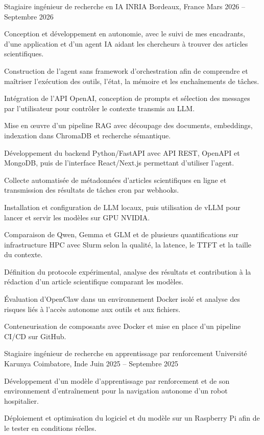 
\begin{cventries}
  \cventry
    {Stagiaire ingénieur de recherche en IA}
    {INRIA}
    {Bordeaux, France}
    {Mars 2026 -- Septembre 2026}
    {
      \begin{cvitems}
        \item {Conception et développement en autonomie, avec le suivi de mes encadrants, d’une application et d’un agent IA aidant les chercheurs à trouver des articles scientifiques.}
        \item {Construction de l’agent sans framework d’orchestration afin de comprendre et maîtriser l’exécution des outils, l’état, la mémoire et les enchaînements de tâches.}
        \item {Intégration de l’API OpenAI, conception de prompts et sélection des messages par l’utilisateur pour contrôler le contexte transmis au LLM.}
        \item {Mise en œuvre d’un pipeline RAG avec découpage des documents, embeddings, indexation dans ChromaDB et recherche sémantique.}
        \item {Développement du backend Python/FastAPI avec API REST, OpenAPI et MongoDB, puis de l’interface React/Next.js permettant d’utiliser l’agent.}
        \item {Collecte automatisée de métadonnées d’articles scientifiques en ligne et transmission des résultats de tâches cron par webhooks.}
        \item {Installation et configuration de LLM locaux, puis utilisation de vLLM pour lancer et servir les modèles sur GPU NVIDIA.}
        \item {Comparaison de Qwen, Gemma et GLM et de plusieurs quantifications sur infrastructure HPC avec Slurm selon la qualité, la latence, le TTFT et la taille du contexte.}
        \item {Définition du protocole expérimental, analyse des résultats et contribution à la rédaction d’un article scientifique comparant les modèles.}
        \item {Évaluation d’OpenClaw dans un environnement Docker isolé et analyse des risques liés à l’accès autonome aux outils et aux fichiers.}
        \item {Conteneurisation de composants avec Docker et mise en place d’un pipeline CI/CD sur GitHub.}
      \end{cvitems}
    }

  \cventry
    {Stagiaire ingénieur de recherche en apprentissage par renforcement}
    {Université Karunya}
    {Coimbatore, Inde}
    {Juin 2025 -- Septembre 2025}
    {
      \begin{cvitems}
        \item {Développement d’un modèle d’apprentissage par renforcement et de son environnement d’entraînement pour la navigation autonome d’un robot hospitalier.}
        \item {Déploiement et optimisation du logiciel et du modèle sur un Raspberry Pi afin de le tester en conditions réelles.}
      \end{cvitems}
    }
\end{cventries}
